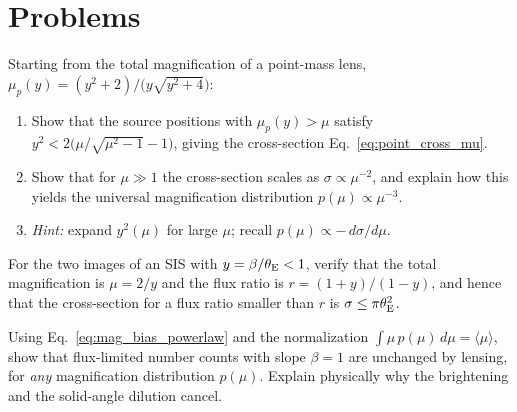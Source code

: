 \section{Problems}
\label{sec:statistics_problems}

\begin{exercise}
\label{ex:point_cross}
Starting from the total magnification of a point-mass lens,
$\mu_p(y) = (y^2+2)/\big(y\sqrt{y^2+4}\big)$:
\begin{enumerate}[label=(\alph*)]
    \item Show that the source positions with $\mu_p(y) > \mu$ satisfy
          $y^2 < 2\big(\mu/\sqrt{\mu^2-1} - 1\big)$, giving the
          cross-section Eq.~\eqref{eq:point_cross_mu}.
    \item Show that for $\mu \gg 1$ the cross-section scales as
          $\sigma \propto \mu^{-2}$, and explain how this yields the
          universal magnification distribution $p(\mu) \propto \mu^{-3}$.
    \item \textit{Hint:} expand $y^2(\mu)$ for large $\mu$; recall
          $p(\mu) \propto -\,d\sigma/d\mu$.
\end{enumerate}
\end{exercise}

\begin{exercise}
\label{ex:sis_stats}
For the two images of an SIS with $y = \beta/\theta_{\mathrm{E}} < 1$, verify that the
total magnification is $\mu = 2/y$ and the flux ratio is
$r = (1+y)/(1-y)$, and hence that the cross-section for a flux ratio
smaller than $r$ is $\sigma \le \pi\theta_{\mathrm{E}}^2$.
\end{exercise}

\begin{exercise}[The $\beta = 1$ null of magnification bias]
\label{ex:bias_null}
Using Eq.~\eqref{eq:mag_bias_powerlaw} and the normalization
$\int \mu\,p(\mu)\,d\mu = \langle\mu\rangle$, show that flux-limited
number counts with slope $\beta = 1$ are unchanged by lensing, for
\emph{any} magnification distribution $p(\mu)$.  Explain physically why
the brightening and the solid-angle dilution cancel.
\end{exercise}
